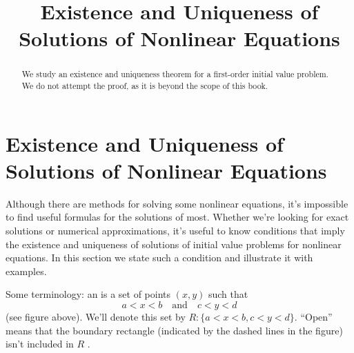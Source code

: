 \documentclass{ximera}
\title{Existence and Uniqueness of Solutions of Nonlinear Equations}%
\begin{document}
\begin{abstract}
We study  an existence and uniqueness theorem for a first-order initial value problem.  We do not attempt the proof, as it is beyond the scope of this book.
\end{abstract}

\maketitle

\section*{Existence and Uniqueness of Solutions of Nonlinear Equations}

Although  there are  methods for
 solving some nonlinear equations, it's
impossible to find  useful formulas for the solutions of most.
Whether we're looking for  exact solutions or numerical
approximations, it's useful to know  conditions that imply the
existence and uniqueness of solutions of initial value problems for
nonlinear equations. In this section we state  such a condition and
illustrate it with examples.


\begin{center}
\end{center}


Some terminology:
 an 
 is a set of points $(x,y)$ such that
$$
a<x<b\quad\mbox{and}\quad c<y<d
$$
 (see figure above).  We'll denote this set by
$R:  \{ a < x < b, c < y < d \}$.
 ``Open'' means that the
boundary rectangle (indicated by the dashed lines in
the figure) isn't  included in  $R$ .
\end{document}
